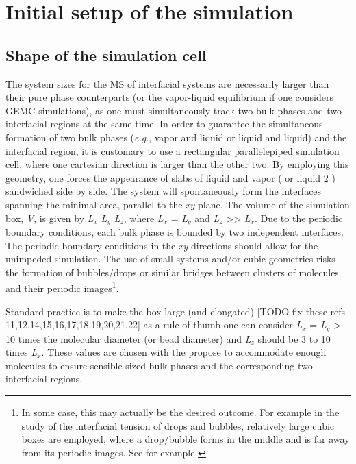 \documentclass{scrbook}
\begin{document}
\chapter{Initial setup of the simulation}

\section{Shape of the simulation cell}

The system sizes for the MS of interfacial systems are necessarily larger than
their pure phase counterparts (or the vapor-liquid equilibrium if one considers
GEMC simulations), as one must simultaneously track two bulk phases and two
interfacial regions at the same time. In order to guarantee the simultaneous
formation of two bulk phases (\textit{e.g}., vapor and liquid or liquid and
liquid) and the interfacial region, it is customary to use a rectangular
parallelepiped simulation cell, where one cartesian direction is larger than
the other two. By employing this geometry, one forces the appearance of slabs
of liquid and vapor ( or liquid 2 ) sandwiched side by side. The system will
spontaneously form the interfaces spanning the minimal area, parallel to the
\textit{xy} plane. The volume of the simulation box, \textit{V}, is given by
\textit{L}$_{x}$ \textit{L}$_{y}$ \textit{L}$_{z}$, where \textit{L}$_{x}$
= \textit{L}$_{y}$ and \textit{L}$_{z}$ {\textgreater}{\textgreater}
\textit{L}$_{x}$. Due to the periodic boundary conditions, each bulk phase is
bounded by two independent interfaces. The periodic boundary conditions in the
\textit{xy} directions should allow for the unimpeded simulation. The use of
small systems and/or cubic geometries risks the formation of bubbles/drops or
similar bridges between clusters of molecules and their periodic
images\footnote{In some case, this may actually be the desired outcome.
For example in the study of the interfacial tension of drops and bubbles,
relatively large cubic boxes are employed, where a drop/bubble forms in the
middle and is far away from its periodic images. See for example \citep{lau2015}}.

Standard practice is to make the box large (and elongated)
[TODO fix these refs 11,12,14,15,16,17,18,19,20,21,22] as a rule of thumb one can consider
\textit{L}$_{x}$ = \textit{L}$_{y}$ {\textgreater} 10 times the molecular
diameter (or bead diameter) and \textit{L}$_{z}$ should be 3 to 10 times
\textit{L}$_{x}$. These values are chosen with the propose to accommodate
enough molecules to ensure sensible-sized bulk phases and the corresponding two
interfacial regions. 
\end{document}
